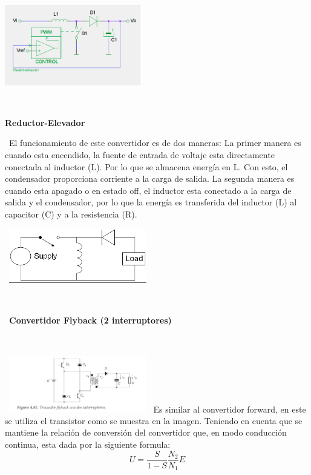 \documentclass[12pt,letterpaper]{article}
\begin{document}
\

\

\includegraphics[width=6cm]{Elevador Boost.png} 
\

\

\textbf{Reductor-Elevador}

\
El funcionamiento de este convertidor es de dos maneras:
La primer manera es cuando esta encendido, la fuente de entrada de voltaje esta directamente conectada al inductor (L). Por lo que se almacena energía en L. Con esto, el condensador proporciona corriente a la carga de salida.
La segunda manera es cuando esta apagado o en estado off, el inductor esta conectado a la carga de salida y el condensador, por lo que la energía es transferida del inductor (L) al capacitor (C) y a la resistencia (R).
\

\
\includegraphics[width=6cm]{Reductor-Elevador.png} 





\

\
\textbf{Convertidor Flyback (2 interruptores)}

\

\
\includegraphics[width=6cm]{Flyback.png} 
\
Es similar al convertidor forward, en este se utiliza el transistor como se muestra en la imagen.
Teniendo en cuenta que se mantiene la relación de conversión del convertidor que, en modo conducción continua, esta dada por la siguiente formula:
$$U= \frac{S}{1-S} \frac{N_2}{N_1}E$$

\

\
\end{document}
